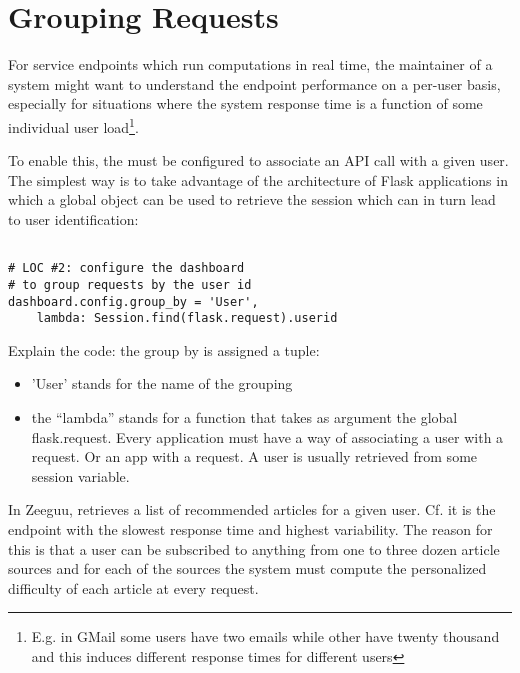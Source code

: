 
\section{Grouping Requests}
\label{sec:user}

For service endpoints which run computations in real time, the maintainer of a system might want to understand the endpoint performance on a per-user basis, especially for situations where the system response time is a function of some individual user load\footnote{E.g. in GMail some users have two emails while other have twenty thousand and this induces different response times for different users}.


To enable this, the \tool must be configured to associate an API call with a given user. The simplest way is to take advantage of the architecture of Flask applications in which a global  object can be used to retrieve the session which can in turn lead to user identification: 

\begin{lstlisting}[style=custompython]  

# LOC #2: configure the dashboard
# to group requests by the user id
dashboard.config.group_by = 'User',
	lambda: Session.find(flask.request).userid

\end{lstlisting}

Explain the code: the group by is assigned a tuple: 

\begin{itemize}
	\item 'User' stands for the name of the grouping
	\item the ``lambda'' stands for a function that takes as argument
	the global flask.request. Every application must have a way of
	associating a user with a request. Or an app with a request. 
	A user is usually retrieved from some session variable. 
\end{itemize}


In Zeeguu, \epFeedItems retrieves a list of recommended articles for a given user. Cf.  it is the endpoint with the slowest response time and highest variability. The reason for this is that a user can be subscribed to anything from one to three dozen article sources and for each of the sources the system must compute the personalized difficulty of each article at every request. 


